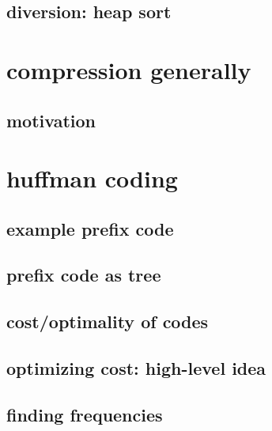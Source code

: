 \subsection{diversion: heap sort}



\section{compression generally} 

\subsection{motivation}



\section{huffman coding}

\subsection{example prefix code}



\subsection{prefix code as tree}



\subsection{cost/optimality of codes}



\subsection{optimizing cost: high-level idea}




\subsection{finding frequencies}

